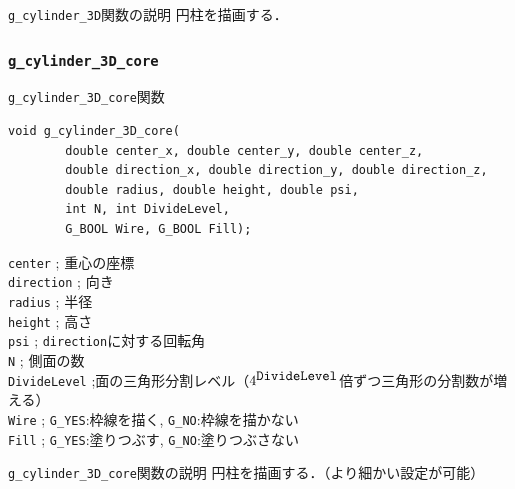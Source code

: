 \documentclass[platex,a4paper,12pt]{jsarticle}%
\begin{document}
\begin{itembox}[l]{\texttt{g\_cylinder\_3D}関数の説明}
円柱を描画する．
\end{itembox}



\clearpage
\subsubsection{\texttt{g\_cylinder\_3D\_core}}

\begin{itembox}[l]{\texttt{g\_cylinder\_3D\_core}関数}
\begin{verbatim}
void g_cylinder_3D_core(
        double center_x, double center_y, double center_z,
        double direction_x, double direction_y, double direction_z,
        double radius, double height, double psi,
        int N, int DivideLevel, 
        G_BOOL Wire, G_BOOL Fill);   
\end{verbatim}
\verb|center| ; 重心の座標\\
\verb|direction| ; 向き\\
\verb|radius| ; 半径\\
\verb|height| ; 高さ\\
\verb|psi| ; \verb|direction|に対する回転角\\
\verb|N| ; 側面の数\\
\verb|DivideLevel| ;面の三角形分割レベル（$4^{\verb|DivideLevel|}$倍ずつ三角形の分割数が増える）\\
\verb|Wire| ; \verb|G_YES|:枠線を描く, \verb|G_NO|:枠線を描かない \\
\verb|Fill| ; \verb|G_YES|:塗りつぶす, \verb|G_NO|:塗りつぶさない
\end{itembox}

\begin{itembox}[l]{\texttt{g\_cylinder\_3D\_core}関数の説明}
円柱を描画する．（より細かい設定が可能）
\end{itembox}
\end{document}
